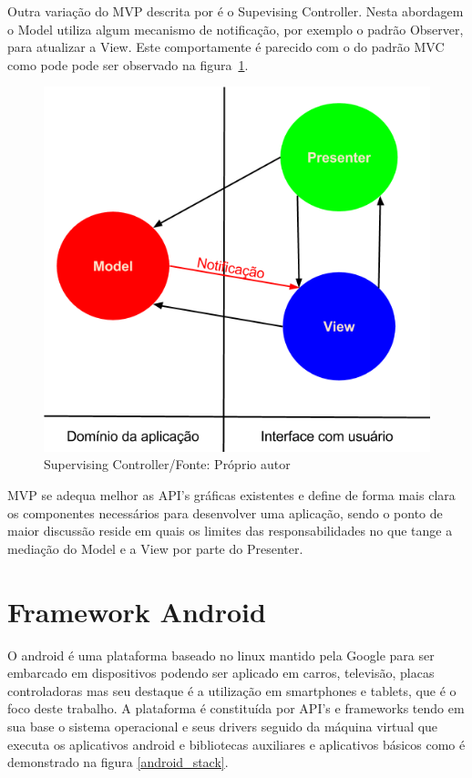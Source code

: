 Outra variação do MVP descrita por  é o Supevising
Controller. Nesta abordagem o Model utiliza algum mecanismo de notificação, por
exemplo o padrão Observer, para atualizar a View. Este comportamente é parecido
com o do padrão MVC como pode pode ser observado na
figura~\ref{fig:sup_controller}.

\begin{figure}[ht]
	\centering
	\includegraphics[scale=0.5]{img/supervising_controller.png}
	\caption{Supervising Controller/Fonte: Próprio autor}
	\label{fig:sup_controller}
\end{figure}


MVP se adequa melhor as API's gráficas existentes e define de forma mais clara
os componentes necessários para desenvolver uma aplicação, sendo o ponto de maior
discussão reside em quais os limites das responsabilidades no que tange a
mediação do Model e a View por parte do Presenter.



\section{Framework Android}
 

O android é uma plataforma baseado no linux mantido pela Google para
ser embarcado em dispositivos podendo ser aplicado em carros, televisão, placas
controladoras mas seu destaque é a utilização em smartphones e
tablets, que é o foco deste trabalho. A plataforma é constituída por API's e
frameworks tendo em sua base o sistema operacional e seus drivers seguido da
máquina virtual que executa os aplicativos android e bibliotecas auxiliares e
aplicativos básicos como é demonstrado na figura \ref{android_stack}.

